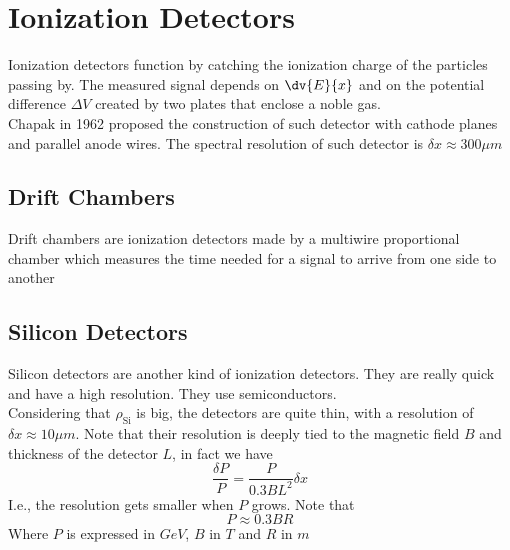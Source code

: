 \documentclass[../qm.tex]{subfiles}
\begin{document}
\section{Ionization Detectors}
Ionization detectors function by catching the ionization charge of the particles passing by. The measured signal depends on $\dv{E}{x}$ and on the potential difference $\Delta V$ created by two plates that enclose a noble gas.\\
Chapak in 1962 proposed the construction of such detector with cathode planes and parallel anode wires. The spectral resolution of such detector is $\delta x\approx300\unit{\mu m}$
\subsection{Drift Chambers}
Drift chambers are ionization detectors made by a multiwire proportional chamber which measures the time needed for a signal to arrive from one side to another
\subsection{Silicon Detectors}
Silicon detectors are another kind of ionization detectors. They are really quick and have a high resolution. They use semiconductors.\\
Considering that $\rho_{\mathrm{Si}}$ is big, the detectors are quite thin, with a resolution of $\delta x\approx10\unit{\mu m}$. Note that their resolution is deeply tied to the magnetic field $B$ and thickness of the detector $L$, in fact we have
\begin{equation}
	\frac{\delta P}{P}=\frac{P}{0.3BL^2}\delta x
	\label{eq:resolutionsilicondet}
\end{equation}
I.e., the resolution gets smaller when $P$ grows. Note that
\begin{equation*}
	P\approx0.3BR
\end{equation*}
Where $P$ is expressed in $\unit{GeV}$, $B$ in $\unit{T}$ and $R$ in $\unit{m}$
\end{document}
